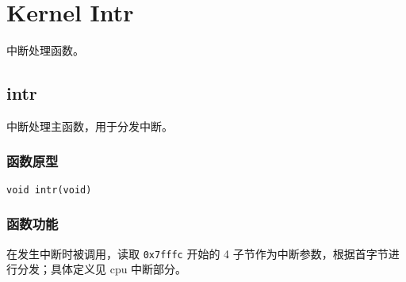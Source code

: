 %
%
%
%
%
%
%
%

\chapter{Kernel Intr}
中断处理函数。

\section{intr}
中断处理主函数，用于分发中断。

\subsection{函数原型}

\texttt{void intr(void)}

\subsection{函数功能}

在发生中断时被调用，读取 \texttt{0x7fffc} 开始的 4 子节作为中断参数，根据首字节进行分发；具体定义见 cpu 中断部分。